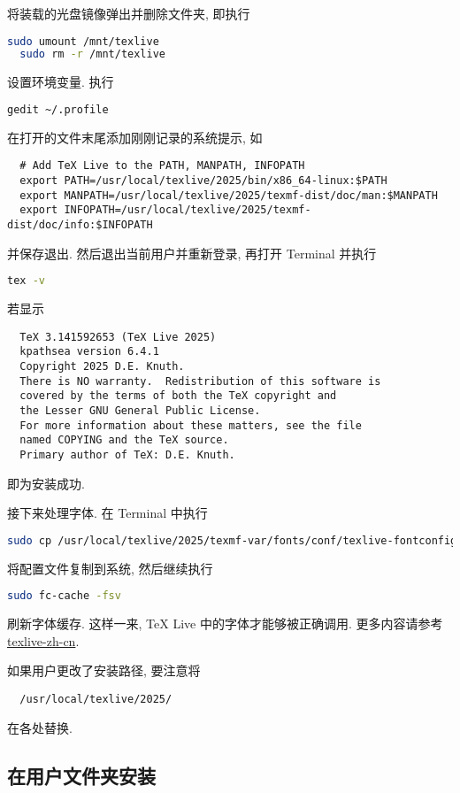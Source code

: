将装载的光盘镜像弹出并删除文件夹,
即执行
\begin{lstlisting}[language = bash]
  sudo umount /mnt/texlive
  sudo rm -r /mnt/texlive
\end{lstlisting}

设置环境变量.
执行
\begin{lstlisting}[language = bash]
  gedit ~/.profile
\end{lstlisting}
在打开的文件末尾添加刚刚记录的系统提示,
如
\begin{lstlisting}
  # Add TeX Live to the PATH, MANPATH, INFOPATH
  export PATH=/usr/local/texlive/2025/bin/x86_64-linux:$PATH
  export MANPATH=/usr/local/texlive/2025/texmf-dist/doc/man:$MANPATH
  export INFOPATH=/usr/local/texlive/2025/texmf-dist/doc/info:$INFOPATH
\end{lstlisting}
并保存退出.
然后退出当前用户并重新登录,
再打开 \textsf{Terminal} 并执行
\begin{lstlisting}[language=bash]
  tex -v
\end{lstlisting}
若显示
\begin{lstlisting}
  TeX 3.141592653 (TeX Live 2025)
  kpathsea version 6.4.1
  Copyright 2025 D.E. Knuth.
  There is NO warranty.  Redistribution of this software is
  covered by the terms of both the TeX copyright and
  the Lesser GNU General Public License.
  For more information about these matters, see the file
  named COPYING and the TeX source.
  Primary author of TeX: D.E. Knuth.
\end{lstlisting}
即为安装成功.

接下来处理字体.
在 \textsf{Terminal} 中执行
\begin{lstlisting}[language=bash]
  sudo cp /usr/local/texlive/2025/texmf-var/fonts/conf/texlive-fontconfig.conf /etc/fonts/conf.d/09-texlive.conf
\end{lstlisting}
将配置文件复制到系统,
然后继续执行
\begin{lstlisting}[language=bash]
  sudo fc-cache -fsv
\end{lstlisting}
刷新字体缓存.
这样一来, \TeX{} Live 中的字体才能够被正确调用.
更多内容请参考 \href{https://tug.org/texlive/doc/texlive-zh-cn/texlive-zh-cn.pdf}{texlive-zh-cn}.

如果用户更改了安装路径,
要注意将
\begin{lstlisting}
  /usr/local/texlive/2025/
\end{lstlisting}
在各处替换.

\subsection{在用户文件夹安装}\label{subsec:ubuntu-user-folder}

